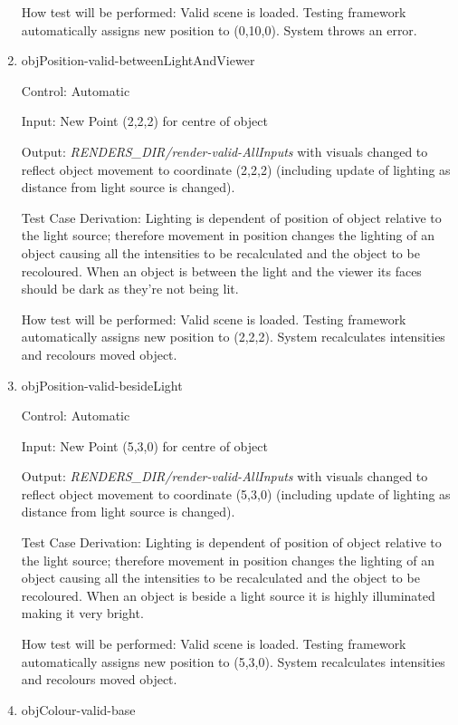 \documentclass[12pt, titlepage]{article}
\begin{document}
\begin{enumerate}
	How test will be performed: Valid scene is loaded. Testing framework 
	automatically assigns new position to (0,10,0). System throws an error.

	\item{objPosition-valid-betweenLightAndViewer\\}
	
	Control: Automatic
	
	Input: New Point (2,2,2) for centre of object
	
	Output: \textit{RENDERS\_DIR/render-valid-AllInputs} with visuals changed 
	to reflect object movement to coordinate (2,2,2) (including update of 
	lighting as distance from light source is changed).
	
	Test Case Derivation: Lighting is dependent of position of object relative 
	to the light source; therefore movement in position changes the lighting of 
	an object causing all the intensities to be recalculated and the object to 
	be recoloured. When an object is between the light and the viewer its faces 
	should be dark as they're not being lit.
	
	How test will be performed: Valid scene is loaded. Testing framework 
	automatically assigns new position to (2,2,2). System recalculates 
	intensities and recolours moved object.	
	
	\item{objPosition-valid-besideLight\\}
	
	Control: Automatic
	
	Input: New Point (5,3,0) for centre of object
	
	Output: \textit{RENDERS\_DIR/render-valid-AllInputs} with visuals changed 
	to reflect object movement to coordinate (5,3,0) (including update of 
	lighting as distance from light source is changed).
	
	Test Case Derivation: Lighting is dependent of position of object relative 
	to the light source; therefore movement in position changes the lighting of 
	an object causing all the intensities to be recalculated and the object to 
	be recoloured. When an object is beside a light source it is highly 
	illuminated making it very bright.
	
	How test will be performed: Valid scene is loaded. Testing framework 
	automatically assigns new position to (5,3,0). System recalculates 
	intensities and recolours moved object.			

	\item{objColour-valid-base\\}
	

\end{enumerate}
\end{document}
